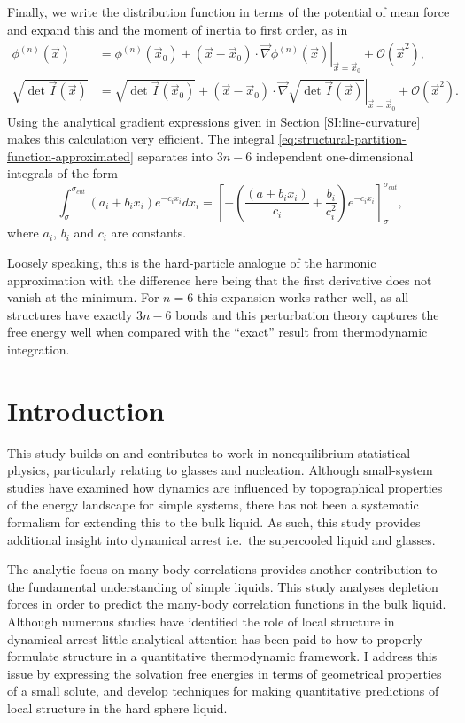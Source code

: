 \documentclass[11pt,twoside]{report}
\begin{document}
Finally, we write the distribution function in terms of the potential of mean force and expand this and the moment of inertia to first order, as in
\begin{align}
  \phi^{(n)}(\vec{x}) &=
  \phi^{(n)}(\vec{x}_0) +
  (\vec{x} - \vec{x}_0) \cdot
  \left. \vec{\nabla} \phi^{(n)}(\vec{x}) \right|_{\vec{x} = \vec{x}_0} +
  \mathcal{O}(\vec{x}^2), \\
  \sqrt{\det{\vec{I}(\vec{x})}} &=
  \sqrt{\det{\vec{I}(\vec{x}_0)}} +
  (\vec{x} - \vec{x}_0) \cdot
  \left. \vec{\nabla} \sqrt{\det{\vec{I}(\vec{x})}} \right|_{\vec{x} = \vec{x}_0} +
  \mathcal{O}(\vec{x}^2).
\end{align}
Using the analytical gradient expressions given in Section \ref{SI:line-curvature} makes this calculation very efficient.
The integral \eqref{eq:structural-partition-function-approximated} separates into $3n-6$ independent one-dimensional integrals of the form
\begin{equation*}
  \int_\sigma^{\sigma_{cut}} (a_i + b_i x_i) e^{-c_i x_i} dx_i
  = \left[
    - \left(
    \frac{(a + b_i x_i)}{c_i} + \frac{b_i}{c_i^2} \right) e^{-c_i x_i}
  \right]_\sigma^{\sigma_{cut}},
\end{equation*}
where $a_i$, $b_i$ and $c_i$ are constants.

Loosely speaking, this is the hard-particle analogue of the harmonic approximation with the difference here being that the first derivative does not vanish at the minimum.
For $n=6$ this expansion works rather well, as all structures have exactly $3n-6$ bonds and this perturbation theory captures the free energy well when compared with the ``exact'' result from thermodynamic integration.

\section{Introduction}

This study builds on and contributes to work in nonequilibrium statistical physics, particularly relating to glasses and nucleation.
Although small-system studies have examined how dynamics are influenced by topographical properties of the energy landscape for simple systems, there has not been a systematic formalism for extending this to the bulk liquid.
As such, this study provides additional insight into dynamical arrest i.e.\ the supercooled liquid and glasses.

The analytic focus on many-body correlations provides another contribution to the fundamental understanding of simple liquids.
This study analyses depletion forces in order to predict the many-body correlation functions in the bulk liquid.
Although numerous studies have identified the role of local structure in dynamical arrest little analytical attention has been paid to how to properly formulate structure in a quantitative thermodynamic framework.
I address this issue by expressing the solvation free energies in terms of geometrical properties of a small solute, and develop techniques for making quantitative predictions of local structure in the hard sphere liquid.
\end{document}
